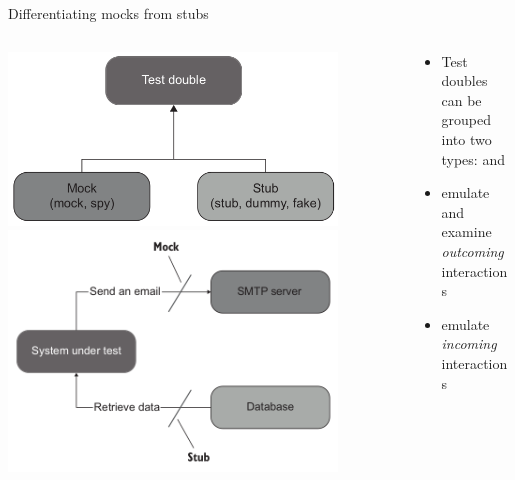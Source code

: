 \documentclass[english,handout,10pt,aspectratio=169,t]{beamer}
\begin{document}
\begin{frame}{Differentiating mocks from stubs}
  \begin{columns}[T]
    \begin{column}[]{0.5\textwidth}
      \includegraphics[width=0.85\textwidth]{images/test_doubles.png}
      \includegraphics[width=0.85\textwidth]{images/stub_vs_mock.png}
    \end{column}
    \begin{column}[]{0.5\textwidth}
      \begin{itemize}
        \item Test doubles can be grouped into two types:  and 
        \item {} emulate and examine \textit{outcoming} interactions
        \item {} emulate \textit{incoming} interactions
      \end{itemize}
    \end{column}
  \end{columns}
\end{frame}
\end{document}
